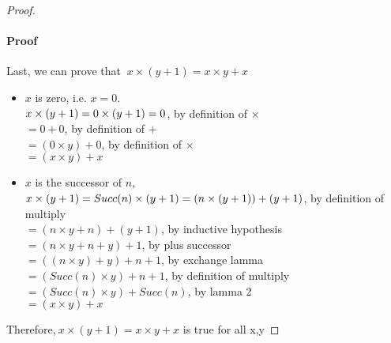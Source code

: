 \documentclass[11pt,a4paper]{article}
\begin{document}
\begin{proof}
    \paragraph{Proof}Last, we can prove that $~x \times (y + 1) = x \times y + x$\\
       \begin{itemize}
        \item $x$ is zero, i.e. $x = 0$.\\
        $
        x \times (y + 1)\\
        = 0 \times (y + 1)\\
        = 0$, by definition of $\times$\\
        $= 0 + 0$, by definition of $+$\\
        $= (0 \times y) + 0$, by definition of $\times$\\
        $= (x \times y) + x$
        \item $x$ is the successor of $n$,\\
        $
        x \times (y + 1)\\
        = Succ(n) \times (y + 1)\\
        = (n \times (y + 1)) + (y + 1)$, by definition of multiply\\
        $= (n \times y + n) + (y + 1)$, by inductive hypothesis\\
        $= (n \times y + n + y) + 1$, by plus successor\\
        $= ((n \times y) + y) + n + 1$, by exchange lamma\\
        $= (Succ(n) \times y) + n + 1$, by definition of multiply\\
        $= (Succ(n) \times y) + Succ(n)$, by lamma 2\\
        $= (x \times y) + x$
    \end{itemize}
    Therefore,$~x \times (y + 1) = x \times y + x$ is true for all x,y
\end{proof}

\end{document}
